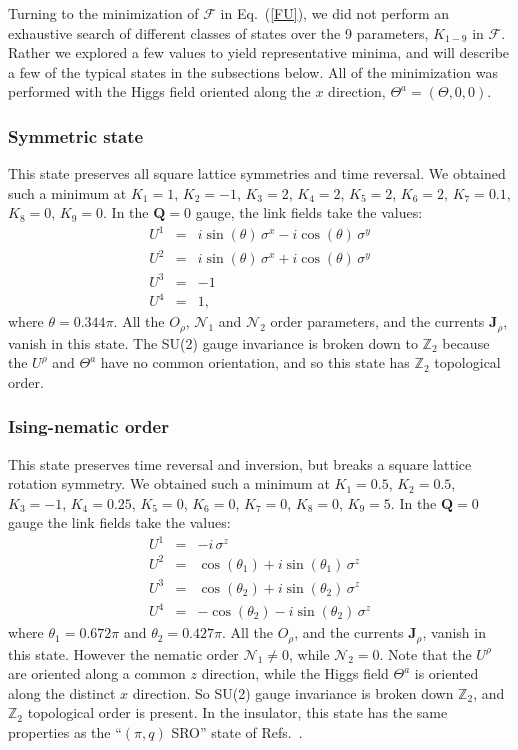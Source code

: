 \documentclass[aps,prb,preprint,onecolumn,citeautoscript,superscriptaddress,footinbib,
eqsecnum]{revtex4-1}
\def\bea{\begin{eqnarray}}
\def\eea{\end{eqnarray}}
\newcommand{\nn}{\nonumber \\}
\begin{document}
Turning to the minimization of $\mathcal{F}$ in Eq.~(\ref{FU}), we did not perform an exhaustive search of different classes of states over the 9 parameters,
$K_{1-9}$ in $\mathcal{F}$. Rather we explored a few values to yield representative minima,
and will describe a few of the typical states in the subsections below. All of the minimization
was performed with the Higgs field oriented along the $x$ direction, $\Theta^a = (\Theta, 0, 0)$.

\subsubsection{Symmetric state}

This state preserves all square lattice symmetries and time reversal. We obtained such a
minimum at $K_1=1$, $K_2 = -1$, $K_3 = 2$, $K_4 =2$, $K_5 =2$, $K_6 =2$, $K_7 = 0.1$,
$K_8=0$, $K_9=0$. In the ${\bm Q}=0$ gauge, the link fields take the values:
\bea
U^1 &=& i \sin (\theta) \, \sigma^x - i \cos (\theta) \, \sigma^y \nn 
U^2 &=& i \sin (\theta) \, \sigma^x + i \cos (\theta) \, \sigma^y \nn
U^3 &=& -1 \nn 
U^4 &=& 1,
\eea 
where $\theta = 0.344 \pi$. All the $O_\rho$, $\mathcal{N}_1$ and $\mathcal{N}_2$ order
parameters, and the currents ${\bm J}_\rho$, vanish in this state. The SU(2) gauge invariance is broken down to $\mathbb{Z}_2$ because the $U^\rho$ and $\Theta^a$ have no common orientation, 
and so this state has $\mathbb{Z}_2$ topological order.

\subsubsection{Ising-nematic order}
\label{sec:nematic}

This state preserves time reversal and inversion, but breaks a square lattice rotation symmetry. 
We obtained such a
minimum at $K_1=0.5$, $K_2 = 0.5$, $K_3 = -1$, $K_4 =0.25$, $K_5 =0$, $K_6 =0$, $K_7 = 0$,
$K_8=0$, $K_9=5$. In the ${\bm Q}=0$ gauge the link fields take the values:
\bea
U^1 &=& -i \, \sigma^z \nn 
U^2 &=& \cos (\theta_1) + i \sin (\theta_1) \,  \sigma^z \nn
U^3 &=& \cos (\theta_2) + i \sin (\theta_2) \,  \sigma^z \nn
U^4 &=& -\cos (\theta_2) - i \sin (\theta_2) \,  \sigma^z
\eea 
where $\theta_1 = 0.672 \pi$ and $\theta_2 = 0.427  \pi$. All the $O_\rho$, and the currents ${\bm J}_\rho$, vanish in this state. 
However the nematic order $\mathcal{N}_1 \neq 0$, while $\mathcal{N}_2 =0$.
Note that the $U^\rho$ are oriented along a common $z$ direction, while the Higgs field $\Theta^a$
is oriented along the distinct $x$ direction. So SU(2) gauge invariance is broken down $\mathbb{Z}_2$,
and $\mathbb{Z}_2$ topological order is present. In the insulator, 
this state has the same properties as the ``$(\pi, q)$ SRO'' state 
of
Refs.~. 
\end{document}
